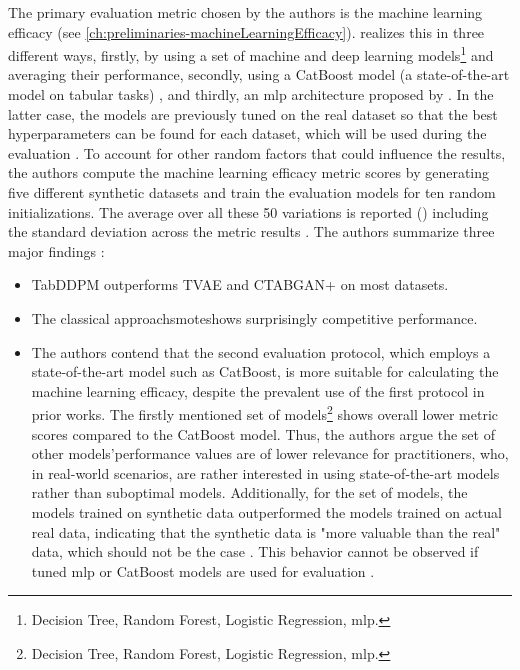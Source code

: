 The primary evaluation metric chosen by the authors is the machine learning efficacy (see \autoref{ch:preliminaries-machineLearningEfficacy}).
\textcite{kotelnikov2022TabDDPMModellingTabular} realizes this in three different ways, firstly, by using a set of machine and deep learning models\footnote[5]{Decision Tree, Random Forest, Logistic Regression, \gls{mlp}.} and averaging their performance,
secondly, using a CatBoost model \cite{prokhorenkova2018CatBoostUnbiasedBoosting}(a state-of-the-art model on tabular tasks) \cite{kotelnikov2022TabDDPMModellingTabular}, and thirdly, an \gls{mlp} architecture proposed by \cite{gorishniy2021RevisitingDeepLearning}.
In the latter case, the models are previously tuned on the real dataset so that the best hyperparameters can be found for each dataset, which will be used during the evaluation \cite{kotelnikov2022TabDDPMModellingTabular}.
To account for other random factors that could influence the results, the authors compute the machine learning efficacy metric scores by generating five different synthetic datasets and train the evaluation models for ten random initializations.
The average over all these 50 variations is reported (\cite[Table 3, 4, p. 8]{kotelnikov2022TabDDPMModellingTabular}) including the standard deviation across the metric results \cite{kotelnikov2022TabDDPMModellingTabular}.
\newpage
\noindent The authors summarize three major findings \cite{kotelnikov2022TabDDPMModellingTabular}:
\begin{itemize}
    \item TabDDPM outperforms TVAE and CTABGAN+ on most datasets.
    \item The classical approach\gls{smote}shows surprisingly competitive performance.
    \item The authors contend that the second evaluation protocol, which employs a state-of-the-art model such as CatBoost, is more suitable for calculating the machine learning efficacy, 
    despite the prevalent use of the first protocol in prior works. 
    The firstly mentioned set of models\footnote[5]{Decision Tree, Random Forest, Logistic Regression, \gls{mlp}.} shows overall lower metric scores compared to the CatBoost model.
    Thus, the authors argue the set of other models'\footnotemark[5] performance values are of lower relevance for practitioners, who, in real-world scenarios, are rather interested in using state-of-the-art models rather than suboptimal models.
    Additionally, for the set of models, the models trained on synthetic data outperformed the models trained on actual real data, indicating that the 
    synthetic data is "more valuable than the real" data, which should not be the case \cite[p. 8]{kotelnikov2022TabDDPMModellingTabular}.
    This behavior cannot be observed if tuned \gls{mlp} or CatBoost models are used for evaluation \cite{kotelnikov2022TabDDPMModellingTabular}.
\end{itemize}

